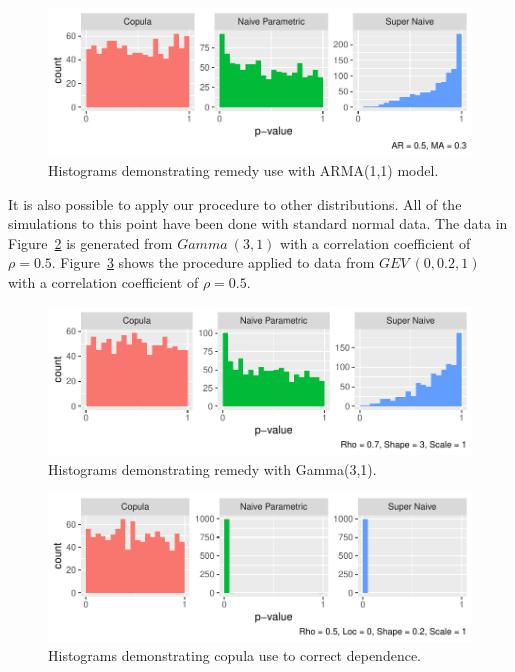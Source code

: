 \documentclass[12pt, letterpaper, titlepage]{article}
\begin{document}
\begin{figure}[tbp]
  \centering
  \includegraphics{hist_copula_arma}
  \caption{Histograms demonstrating remedy use with ARMA(1,1) model.}
  \label{fig:hist_copula_arma}
\end{figure}

It is also possible to apply our procedure to other distributions. All of the simulations
to this point have been done with standard normal data. The data in Figure~\ref{fig:hist_copula_gamma} 
is generated from $Gamma ~ (3,1)$ with a correlation coefficient of $\rho = 0.5$. Figure~\ref{fig:hist_copula_gev}
shows the procedure applied to data from $GEV ~ (0, 0.2, 1)$ with a correlation coefficient of $\rho = 0.5$. 

\begin{figure}[tbp]
  \centering
  \includegraphics{hist_copula_gamma}
  \caption{Histograms demonstrating remedy with Gamma(3,1).}
  \label{fig:hist_copula_gamma}
\end{figure}

\begin{figure}[tbp]
  \centering
  \includegraphics{hist_copula_gev}
  \caption{Histograms demonstrating copula use to correct dependence.}
  \label{fig:hist_copula_gev}
\end{figure}
\end{document}
